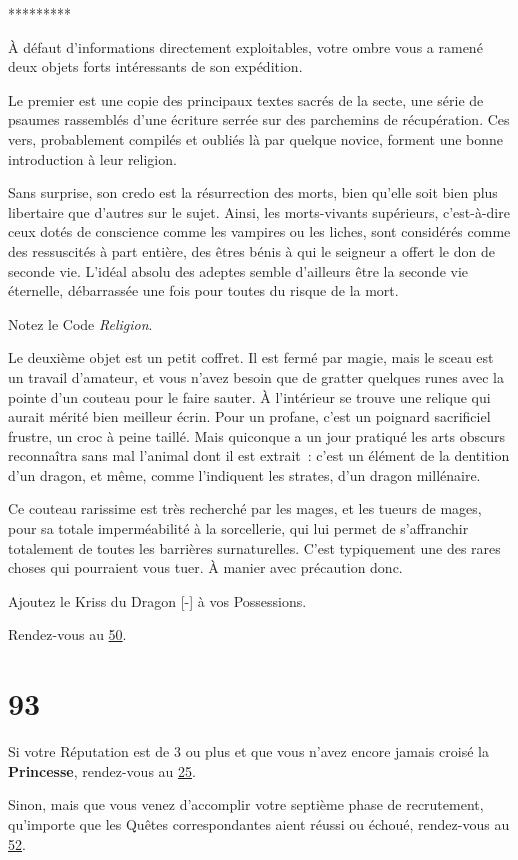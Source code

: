\documentclass{report}
\newcommand{\gsection}[1]{
    \section{#1}
    \label{section-#1}
}
\newcommand{\glink}[1]{\hyperref[section-#1]{#1}}
\newcommand{\ellipse}{
    \begin{center}
        *********
    \end{center}
}
\newcommand{\hero}[1]{\textbf{#1}}
\begin{document}
\ellipse

À défaut d'informations directement exploitables, votre ombre vous a ramené deux objets forts intéressants de son expédition.

Le premier est une copie des principaux textes sacrés de la secte, une série de psaumes rassemblés d'une écriture serrée sur des parchemins de récupération. Ces vers, probablement compilés et oubliés là par quelque novice, forment une bonne introduction à leur religion.

Sans surprise, son credo est la résurrection des morts, bien qu'elle soit bien plus libertaire que d'autres sur le sujet. Ainsi, les morts-vivants supérieurs, c'est-à-dire ceux dotés de conscience comme les vampires ou les liches, sont considérés comme des ressuscités à part entière, des êtres bénis à qui le seigneur a offert le don de seconde vie. L'idéal absolu des adeptes semble d'ailleurs être la seconde vie éternelle, débarrassée une fois pour toutes du risque de la mort.

Notez le Code \emph{Religion}.

Le deuxième objet est un petit coffret. Il est fermé par magie, mais le sceau est un travail d'amateur, et vous n'avez besoin que de gratter quelques runes avec la pointe d'un couteau pour le faire sauter. À l'intérieur se trouve une relique qui aurait mérité bien meilleur écrin. Pour un profane, c'est un poignard sacrificiel frustre, un croc à peine taillé. Mais quiconque a un jour pratiqué les arts obscurs reconnaîtra sans mal l'animal dont il est extrait : c'est un élément de la dentition d'un dragon, et même, comme l'indiquent les strates, d'un dragon millénaire.

Ce couteau rarissime est très recherché par les mages, et les tueurs de mages, pour sa totale imperméabilité à la sorcellerie, qui lui permet de s'affranchir totalement de toutes les barrières surnaturelles. C'est typiquement une des rares choses qui pourraient vous tuer. À manier avec précaution donc.

Ajoutez le Kriss du Dragon [-] à vos Possessions.

Rendez-vous au \glink{50}.

\gsection{93}

Si votre Réputation est de 3 ou plus et que vous n'avez encore jamais croisé la \hero{Princesse}, rendez-vous au \glink{25}.

Sinon, mais que vous venez d'accomplir votre septième phase de recrutement, qu'importe que les Quêtes correspondantes aient réussi ou échoué, rendez-vous au \glink{52}.
\end{document}
